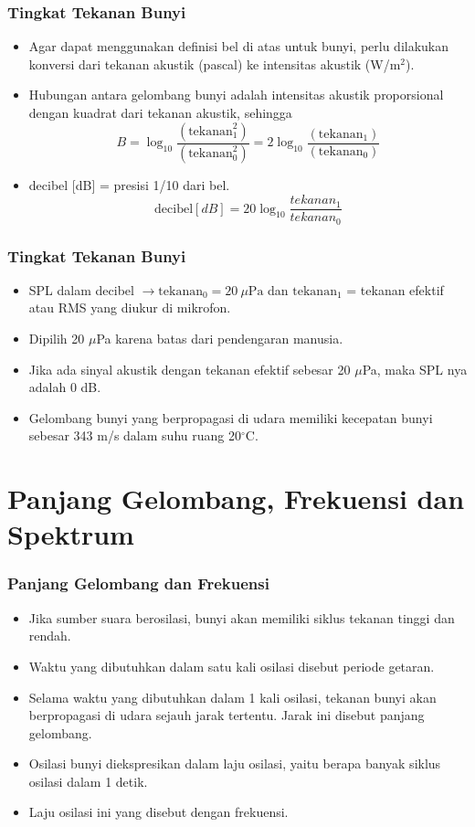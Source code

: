 \documentclass[pdflatex,compress]{beamer}
\begin{document}
\begin{frame}
	\frametitle{Tingkat Tekanan Bunyi}
	\begin{itemize}
		\item Agar dapat menggunakan definisi bel di atas untuk bunyi, perlu dilakukan konversi dari tekanan akustik (pascal) ke intensitas akustik (W/m$ ^2 $).
		\item Hubungan antara gelombang bunyi adalah intensitas akustik proporsional dengan kuadrat dari tekanan akustik, sehingga
		\[ B = \log_{10}\frac{(\text{tekanan}_1^2)}{(\text{tekanan}_0^2)} = 2\log_{10}\frac{(\text{tekanan}_1)}{(\text{tekanan}_0)} \]
		\item decibel [dB] = presisi 1/10 dari bel.
		\[ \text{decibel}[dB] = 20 \log_{10} \frac{tekanan_1}{tekanan_0}  \]
	\end{itemize}
\end{frame}

\begin{frame}
	\frametitle{Tingkat Tekanan Bunyi}
	\begin{itemize}
		\item SPL dalam decibel $\rightarrow \text{tekanan}_0 = 20~ \mu\text{Pa}$ dan $ \text{tekanan}_1 $ = tekanan efektif atau RMS yang diukur di mikrofon.
		\item Dipilih 20 $\mu$Pa karena batas dari pendengaran manusia.
		\item Jika ada sinyal akustik dengan tekanan efektif sebesar 20 $\mu$Pa, maka SPL nya adalah 0 dB.
		\item Gelombang bunyi yang berpropagasi di udara memiliki kecepatan bunyi sebesar 343 m/s dalam suhu ruang 20$^\circ$C.
	\end{itemize}
\end{frame}

\section{Panjang Gelombang, Frekuensi dan Spektrum}
\begin{frame}
	\frametitle{Panjang Gelombang dan Frekuensi}
	\begin{itemize}
		\item Jika sumber suara berosilasi, bunyi akan memiliki siklus tekanan tinggi dan rendah.
		\item Waktu yang dibutuhkan dalam satu kali osilasi disebut periode getaran.
		\item Selama waktu yang dibutuhkan dalam 1 kali osilasi, tekanan bunyi akan berpropagasi di udara sejauh jarak tertentu. Jarak ini disebut panjang gelombang.
		\item Osilasi bunyi diekspresikan dalam laju osilasi, yaitu berapa banyak siklus osilasi dalam 1 detik.
		\item Laju osilasi ini yang disebut dengan frekuensi.
	\end{itemize}
\end{frame}
\end{document}
